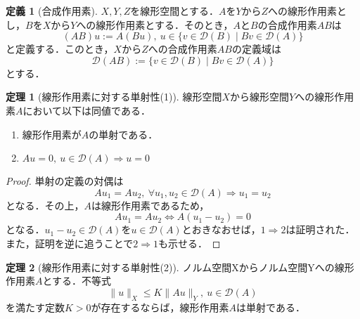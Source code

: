 \documentclass[11pt,a4paper,titlepage]{jsreport}
\theoremstyle{definition}
\newtheorem{dfn}{定義}
\newtheorem{thm}{定理}
\begin{document}
\begin{dfn}[合成作用素]
  \label{dfn:合成作用素}
  $X,Y,Z$を線形空間とする．$A$を$Y$から$Z$への線形作用素とし，$B$を$X$から$Y$への線形作用素とする．そのとき，$A$と$B$の合成作用素$AB$は
  \begin{equation*}
    (AB)u:=A(Bu),\ u\in\{v\in\mathcal{D}(B)\mid Bv\in\mathcal{D}(A)\}
  \end{equation*}
  と定義する．このとき，$X$から$Z$への合成作用素$AB$の定義域は
  \begin{equation*}
    \mathcal{D}(AB):=\{v\in\mathcal{D}(B)\mid Bv\in\mathcal{D}(A)\}
  \end{equation*}
  とする．
\end{dfn}

\begin{thm}[線形作用素に対する単射性(1)]
  \label{thm:線形作用素に対する単射性(1)}
  線形空間$X$から線形空間$Y$への線形作用素$A$において以下は同値である．
  \begin{enumerate}
    \item 線形作用素が$A$の単射である．
    \item $Au=0,\ u\in\mathcal{D}(A)\Rightarrow u=0$
  \end{enumerate}
\end{thm}

\begin{proof}
  単射の定義の対偶は
  \begin{equation*}
    Au_1 = Au_2,\ \forall u_1,u_2\in\mathcal{D}(A)\Rightarrow u_1=u_2
  \end{equation*}
  となる．その上，$A$は線形作用素であるため，
  \begin{equation*}
    Au_1=Au_2\Leftrightarrow A(u_1-u_2)=0
  \end{equation*}
  となる．$u_1-u_2\in\mathcal{D}(A)$を$u\in\mathcal{D}(A)$とおきなおせば，$1\Rightarrow2$は証明された．また，証明を逆に追うことで$2\Rightarrow1$も示せる．
\end{proof}

\begin{thm}[線形作用素に対する単射性(2)]
  ノルム空間Xからノルム空間Yへの線形作用素$A$とする．不等式
  \begin{equation*}
    \|u\|_X \leq K\|Au\|_Y,\ u\in\mathcal{D}(A)
  \end{equation*}
  を満たす定数$K>0$が存在するならば，線形作用素$A$は単射である．
\end{thm}
\end{document}
